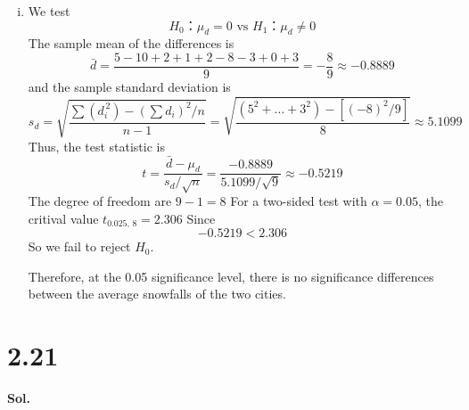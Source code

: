 \documentclass[a4paper, 12pt]{article}  %
\begin{document}
\begin{enumerate}[i.]
    \item We test $$H_0\text{：}\mu_d=0 \text{ vs } H_1\text{：}\mu_d\ne 0$$
    The sample mean of the differences is
    $$\bar{d}=\frac{5-10+2+1+2-8-3+0+3}{9}=-\frac{8}{9}\approx-0.8889$$
    and the sample standard deviation is
    $$s_d=\sqrt{\frac{\sum (d_i^{\,2})-(\sum d_i)^2/n}{n-1}}=\sqrt{\frac{(5^2+\dots+3^2)-[(-8)^2/9]}{8}}\approx 5.1099$$
    Thus, the test statistic is
    $$t=\frac{\bar{d}-\mu_d}{s_d/\sqrt{n}}=\frac{-0.8889}{5.1099/\sqrt{9}}\approx-0.5219$$
    The degree of freedom are $9-1=8$
    For a two-sided test with $\alpha=0.05$, the critival value $t_{0.025,\,8}=2.306$
    Since $$-0.5219<2.306$$
    So we fail to reject $H_0$.
    
    Therefore, at the 0.05 significance level, there is no significance differences between the average snowfalls of the two cities.
\end{enumerate}


\section*{2.21}
\textbf{Sol.}
\end{document}

